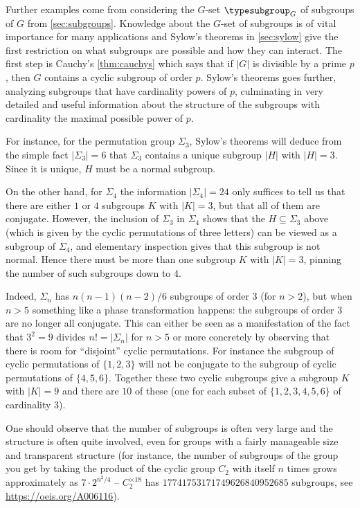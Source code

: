 Further examples come from considering the $G$-set $\typesubgroup_G$ of subgroups of $G$ from \cref{sec:subgroups}.  Knowledge about the $G$-set of subgroups is of vital importance for many applications and Sylow's theorems in  \cref{sec:sylow} give the first restriction on what subgroups are possible and how they can interact.  The first step is Cauchy's \cref{thm:cauchys} which says that if $|G|$ is divisible by a prime $p$, then $G$ contains a cyclic subgroup of order $p$.  Sylow's theorems goes further, analyzing subgroups that have cardinality powers of $p$, culminating in very detailed and useful information about the structure of the subgroups with cardinality the maximal possible power of $p$.
\begin{example}
  For instance, for the permutation group $\Sigma_3$, Sylow's theorems will deduce from the simple fact $|\Sigma_3|=6$ that $\Sigma_3$ contains a unique subgroup $|H|$ with $|H|=3$.  Since it is unique, $H$ must be a normal subgroup.

On the other hand, for $\Sigma_4$ the information $|\Sigma_4|=24$ only suffices to tell us that there are either $1$ or $4$ subgroups $K$ with $|K|=3$, but that all of them are conjugate.  However, the inclusion of $\Sigma_3$ in $\Sigma_4$ shows that the $H\subseteq\Sigma_3$ above (which is given by the cyclic permutations of three letters) can be viewed as a subgroup of $\Sigma_4$, and elementary inspection gives that this subgroup is not normal.  Hence there must be more than one subgroup $K$ with $|K|=3$, pinning the number of such subgroups down to $4$.

Indeed, $\Sigma_n$ has $n(n-1)(n-2)/6$ subgroups of order $3$ (for $n>2$), but when $n>5$ something like a phase transformation happens: the subgroups of order $3$ are no longer all conjugate.  This can either be seen as a manifestation of the fact that $3^2=9$ divides $n!=|\Sigma_n|$ for $n>5$ or more concretely by observing that there is room for ``disjoint'' cyclic permutations.  For instance the subgroup of cyclic permutations of $\{1,2,3\}$ will not be conjugate to the subgroup of cyclic permutations of $\{4,5,6\}$.  Together these two cyclic subgroups give a subgroup $K$ with $|K|=9$ and there are $10$ of these (one for each subset of $\{1,2,3,4,5,6\}$ of cardinality $3$).
\end{example}

\begin{remark}
  \label{rem:noofsubgps}
  One should observe that the number of subgroups is often very large and the structure is often quite involved, even for groups with a fairly manageable size and transparent structure (for instance, the number of subgroups of the group you get by taking the product of the cyclic group $C_2$ with itself $n$ times grows approximately as $7\cdot2^{n^2/4}$ -- \eg $C_2^{\times 18}$ has $17741753171749626840952685$ subgroups, see
\url{https://oeis.org/A006116}).
\end{remark}

